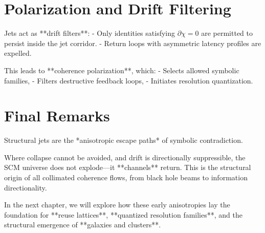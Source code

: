 \section{Polarization and Drift Filtering}

Jets act as **drift filters**:
- Only identities satisfying $\partial \chi = 0$ are permitted to persist inside the jet corridor.
- Return loops with asymmetric latency profiles are expelled.

This leads to **coherence polarization**, which:
- Selects allowed symbolic families,
- Filters destructive feedback loops,
- Initiates resolution quantization.

\section{Final Remarks}

Structural jets are the *anisotropic escape paths* of symbolic contradiction.

Where collapse cannot be avoided, and drift is directionally suppressible, the SCM universe does not explode—it **channels** return. This is the structural origin of all collimated coherence flows, from black hole beams to information directionality.

In the next chapter, we will explore how these early anisotropies lay the foundation for **reuse lattices**, **quantized resolution families**, and the structural emergence of **galaxies and clusters**.
